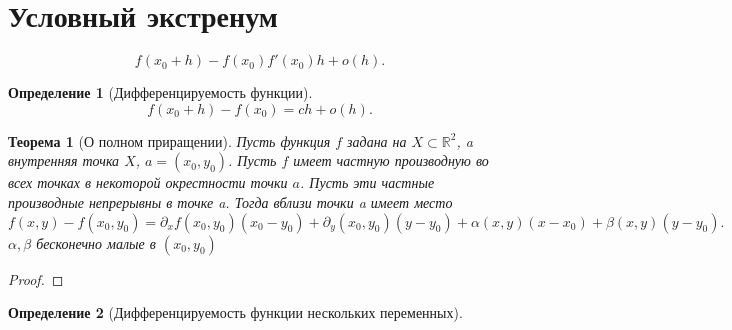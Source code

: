 \documentclass[14pt]{extarticle}
\newtheorem{theorem}{Теорема}
\newtheorem{definition}{Определение}
\begin{document}
\section{Условный экстренум}
\[
f(x_0 + h) - f(x_0) f'(x_0) h + o(h)
.\] 
\begin{definition}[Дифференцируемость функции]
    \[
    f(x_0 + h) - f(x_0) = ch + o(h)
    .\] 
\end{definition}
\begin{theorem}[О полном приращении]
    Пусть функция $f$ задана на  $X \subset \mathbb{R}^{2}$, a внутренняя точка $X$, $a = (x_0,y_0)$.  Пусть $f$ имеет частную производную во всех точках в некоторой окрестности точки  $a$. Пусть эти частные производные непрерывны в точке a. Тогда вблизи точки a имеет место
     \[
    f(x,y) - f(x_0,y_0) = \partial_{x} f (x_0,y_0) (x_0 - y_0) + \partial_{y} (x_0,y_0) (y - y_0) + \alpha(x,y) (x - x_0) + \beta(x,y) (y - y_0)
    .\] 
    $\alpha,\beta$ бесконечно малые в  $(x_0,y_0)$
\end{theorem}
\begin{proof}
    
\end{proof}
\begin{definition}[Дифференцируемость функции нескольких переменных]
    
\end{definition}
\end{document}
